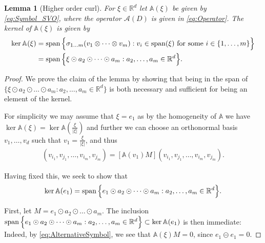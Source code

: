 \documentclass[a4paper, 10pt, twoside, notitlepage]{amsart}
\theoremstyle{plain}
\newtheorem{lem}[prop]{Lemma}
\newcommand{\R}{\mathbb{R}}
\newcommand{\A}{\mathcal{A}}
\renewcommand{\AA}{\mathbb{A}}
\begin{document}
	\begin{lem}[Higher order curl] 
	\label{lem:WaveCone} 
	For $\xi \in \R^d$ let $\AA(\xi)$ be given by \eqref{eq:Symbol_SVO}, where the operator $\A(D)$ is given in \eqref{eq:Operator}.  The kernel of $\AA(\xi)$ is given by
		\begin{align*}
			\ker \AA(\xi) & = \vspan \Big\{ \sigma_{1 \dots m} (v_{1} \otimes \dots \otimes v_{m}): v_{i} \in \vspan(\xi) \text{ for some } i \in \{1,\dots,m\}\Big\} \\
			& = \vspan\Big\{ \xi \odot a_2 \odot \dots \odot a_m: a_2,\dots,a_m \in \R^d \Big\}.
		\end{align*}
	\end{lem}
	
	\begin{proof}
		We prove the claim of the lemma by showing that being in the span of $\{\xi \odot a_2 \odot \dots \odot a_m: a_2,\dots,a_m \in \R^d \}$ is both necessary and sufficient for being an element
		of the kernel.
		
		For simplicity we may assume that $\xi = e_1$ as by the homogeneity of $\AA$ we have $\ker \AA(\xi) = \ker \AA(\frac{\xi}{|\xi|})$ and further we can choose an orthonormal basis
		$v_1,\dots,v_d$ such that $v_1 = \frac{\xi}{|\xi|}$, and thus
		\begin{align*} [\AA(\xi)M](v_{i_1},v_{j_1},\dots,v_{i_m},v_{j_m}) = [\AA(v_1)M](v_{i_1},v_{j_1},\dots,v_{i_m},v_{j_m}).
		\end{align*}
		
		
		Having fixed this, we seek to show that
		\begin{align*}
			\ker \AA(e_1) = \vspan\Big\{ e_1 \odot a_2 \odot \dots \odot a_m: a_2,\dots,a_m \in \R^d\Big\}.
		\end{align*}
		
		First, let $M = e_1 \odot a_2 \odot \dots \odot a_m$. The inclusion $\vspan\Big\{ e_1 \odot a_2 \odot \dots \odot a_m: a_2,\dots,a_m \in \R^d\Big\} \subset \ker \AA(e_1) $ is
		then immediate: Indeed, by \eqref{eq:AlternativeSymbol}, we see that $\AA(\xi)M = 0$, since $e_1 \circleddash e_1 = 0$. 
		

\end{proof}
\end{document}
